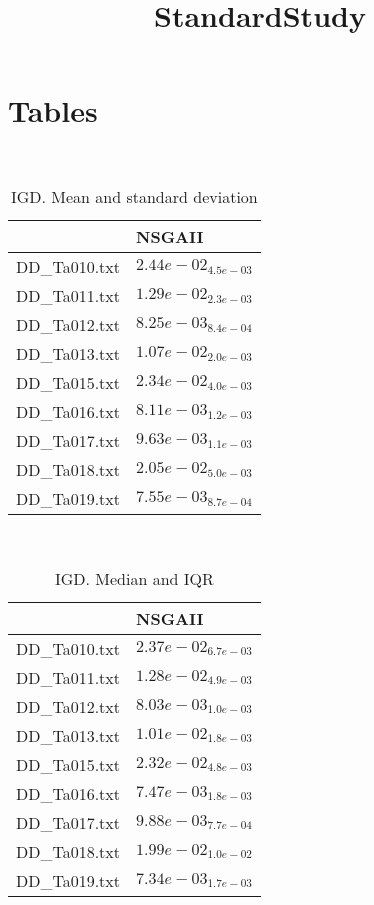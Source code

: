 \documentclass{article}
\title{StandardStudy}
\author{}
\begin{document}
\maketitle
\section{Tables}
\
\begin{table}
\caption{IGD. Mean and standard deviation}
\label{table:mean.IGD}
\centering
\begin{scriptsize}
\begin{tabular}{ll}
\hline &  NSGAII\\
\hline
DD_Ta010.txt & \cellcolor{gray95}$  2.44e-02_{ 4.5e-03}$ \\
DD_Ta011.txt & \cellcolor{gray95}$  1.29e-02_{ 2.3e-03}$ \\
DD_Ta012.txt & \cellcolor{gray95}$  8.25e-03_{ 8.4e-04}$ \\
DD_Ta013.txt & \cellcolor{gray95}$  1.07e-02_{ 2.0e-03}$ \\
DD_Ta015.txt & \cellcolor{gray95}$  2.34e-02_{ 4.0e-03}$ \\
DD_Ta016.txt & \cellcolor{gray95}$  8.11e-03_{ 1.2e-03}$ \\
DD_Ta017.txt & \cellcolor{gray95}$  9.63e-03_{ 1.1e-03}$ \\
DD_Ta018.txt & \cellcolor{gray95}$  2.05e-02_{ 5.0e-03}$ \\
DD_Ta019.txt & \cellcolor{gray95}$  7.55e-03_{ 8.7e-04}$ \\
\hline
\end{tabular}
\end{scriptsize}
\end{table}
\
\begin{table}
\caption{IGD. Median and IQR}
\label{table:median.IGD}
\begin{scriptsize}
\centering
\begin{tabular}{ll}
\hline &  NSGAII\\
\hline
DD_Ta010.txt & \cellcolor{gray95}$  2.37e-02_{ 6.7e-03}$ \\
DD_Ta011.txt & \cellcolor{gray95}$  1.28e-02_{ 4.9e-03}$ \\
DD_Ta012.txt & \cellcolor{gray95}$  8.03e-03_{ 1.0e-03}$ \\
DD_Ta013.txt & \cellcolor{gray95}$  1.01e-02_{ 1.8e-03}$ \\
DD_Ta015.txt & \cellcolor{gray95}$  2.32e-02_{ 4.8e-03}$ \\
DD_Ta016.txt & \cellcolor{gray95}$  7.47e-03_{ 1.8e-03}$ \\
DD_Ta017.txt & \cellcolor{gray95}$  9.88e-03_{ 7.7e-04}$ \\
DD_Ta018.txt & \cellcolor{gray95}$  1.99e-02_{ 1.0e-02}$ \\
DD_Ta019.txt & \cellcolor{gray95}$  7.34e-03_{ 1.7e-03}$ \\
\hline
\end{tabular}
\end{scriptsize}
\end{table}
\end{document}
